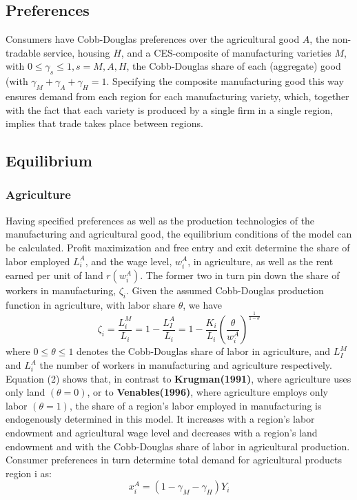 \documentclass[twocolumn]{article}
\begin{document}
\subsection{Preferences}

Consumers have Cobb-Douglas preferences over the agricultural good $A$, the non- tradable service, housing $H$, and a CES-composite of manufacturing varieties $M$, with $0 \leq \gamma_s \leq 1, s=M,A,H$, the Cobb-Douglas share of each (aggregate) good (with $\gamma_M + \gamma_A+\gamma_H =1$. Specifying the composite manufacturing good this way ensures demand from each region for each manufacturing variety, which, together with the fact that each variety is produced by a single firm in a single region, implies that trade takes place between regions.


\subsection{Equilibrium}
\subsubsection{Agriculture}
Having specified preferences as well as the production technologies of the manufacturing and agricultural good, the equilibrium conditions of the model can be calculated. Profit maximization and free entry and exit determine the share of labor employed $L_i^A$, and the wage level, $w_i^A$, in agriculture, as well as the rent earned per unit of land $r(w_i^A)$. The former two in turn pin down the share of workers in manufacturing, $\zeta_i$. Given the assumed Cobb-Douglas production function in agriculture, with labor share $\theta$, we have
\begin{equation}
    \zeta_i = \frac{L_i^M}{L_i} = 1-\frac{L_I^A}{L_i} = 1- \frac{K_i}{L_i}(\frac{\theta}{w_i^A})^{\frac{1}{1-\theta}}
\end{equation}
where $0 \leq \theta \leq 1$ denotes the Cobb-Douglas share of labor in agriculture, and $L_I^M$ and $L_i^A$ the number of workers in manufacturing and agriculture respectively. Equation (2) shows that, in contrast to \textbf{Krugman(1991)}, where agriculture uses only land $(\theta = 0)$, or to \textbf{Venables(1996)}, where agriculture employs only labor $(\theta = 1)$, the share of a region's labor employed in manufacturing is endogenously determined in this model. It increases with a region's labor endowment and agricultural wage level and decreases with a region's land endowment and with the Cobb-Douglas share of labor in agricultural production. Consumer preferences in turn determine total demand for agricultural products region i as:
\begin{equation}
    x_i^A = (1- \gamma_M - \gamma_H)Y_i
\end{equation}
\end{document}
